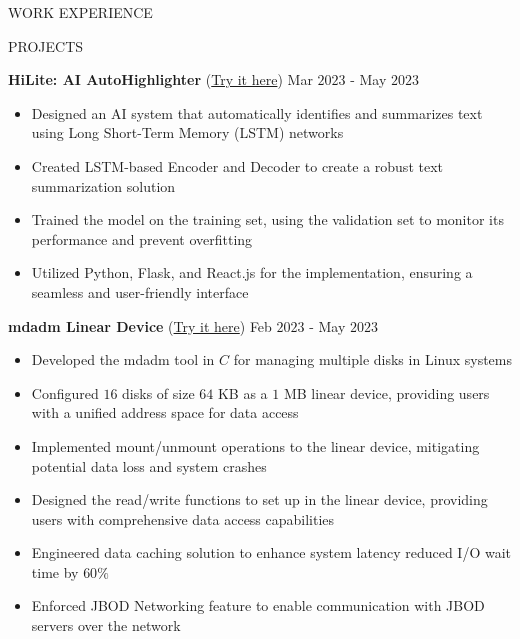 \documentclass{resume} %
\begin{document}
\begin{rSection}{WORK EXPERIENCE}
\end{rSection} 



\begin{rSection}{PROJECTS}

{\bf HiLite: AI AutoHighlighter }{(\href{https://github.com/harshitjain17/HiLite-AIAutoHighlighter}{Try it here})} \hfill Mar $2023$ - May $2023$
\begin{itemize}[itemsep = -4pt]
    \item Designed an AI system that automatically identifies and summarizes text using Long Short-Term Memory (LSTM) networks
    \item Created LSTM-based Encoder and Decoder to create a robust text summarization solution
    \item Trained the model on the training set, using the validation set to monitor its performance and prevent overfitting
    \item Utilized Python, Flask, and React.js for the implementation, ensuring a seamless and user-friendly interface
\end{itemize}

{\bf mdadm Linear Device }{(\href{https://github.com/harshitjain17/mdadm-Linear-Device}{Try it here})} \hfill Feb $2023$ - May $2023$
\begin{itemize}[itemsep = -4pt]
    \item Developed the mdadm tool in $C$ for managing multiple disks in Linux systems
    \item Configured $16$ disks of size $64$ KB as a $1$ MB linear device, providing users with a unified address space for data access
    \item Implemented mount/unmount operations to the linear device, mitigating potential data loss and system crashes
    \item Designed the read/write functions to set up in the linear device, providing users with comprehensive data access capabilities
    \item Engineered data caching solution to enhance system latency reduced I/O wait time by $60\%$
    \item Enforced JBOD Networking feature to enable communication with JBOD servers over the network
\end{itemize}


\end{rSection}
\end{document}
